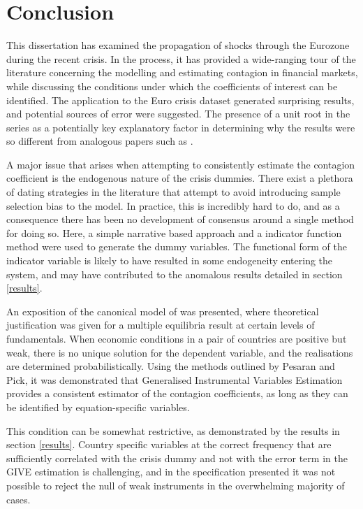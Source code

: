 \documentclass[/../base.tex]{subfiles}
\begin{document}
\section{Conclusion}
\label{conclusion}

This dissertation has examined the propagation of shocks through the Eurozone during the recent crisis. In the process, it has provided a wide-ranging tour of the literature concerning the modelling and estimating contagion in financial markets, while discussing the conditions under which the coefficients of interest can be identified. The application to the Euro crisis dataset generated surprising results, and potential sources of error were suggested. The presence of a unit root in the series as a potentially key explanatory factor in determining why the results were so different from analogous papers such as \cite{metiu2012sovereign}.

A major issue that arises when attempting to consistently estimate the contagion coefficient is the endogenous nature of the crisis dummies. There exist a plethora of dating strategies in the literature that attempt to avoid introducing sample selection bias to the model. In practice, this is incredibly hard to do, and as a consequence there has been no development of consensus around a single method for doing so. Here, a simple narrative based approach and a indicator function method were used to generate the dummy variables. The functional form of the indicator variable is likely to have resulted in some endogeneity entering the system, and may have contributed to the anomalous results detailed in section \ref{results}.

An exposition of the canonical model of \cite{pesaran2007econometric} was presented, where theoretical justification was given for a multiple equilibria result at certain levels of fundamentals. When economic conditions in a pair of countries are positive but weak, there is no unique solution for the dependent variable, and the realisations are determined probabilistically. Using the methods outlined by Pesaran and Pick, it was demonstrated that Generalised Instrumental Variables Estimation provides a consistent estimator of the contagion coefficients, as long as they can be identified by equation-specific variables. 

This condition can be somewhat restrictive, as demonstrated by the results in section \ref{results}. Country specific variables at the correct frequency that are sufficiently correlated with the crisis dummy and not with the error term in the GIVE estimation is challenging, and in the specification presented it was not possible to reject the null of weak instruments in the overwhelming majority of cases. 
\end{document}
